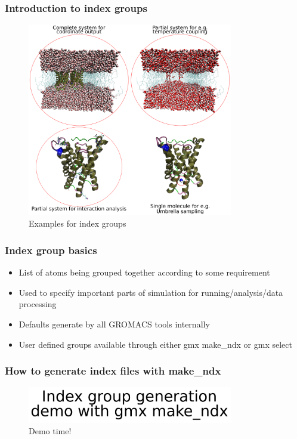 \documentclass{beamer}
\numberwithin{table}{section}
\numberwithin{figure}{section}
\numberwithin{equation}{section}
\begin{document}
\begin{frame}
\frametitle{Introduction to index groups}
    \begin{figure}[htb]
        \centering
        \includegraphics[keepaspectratio=true, width=0.8\textwidth]{figures/index-groups.pdf}
        \caption{Examples for index groups}
    \end{figure}
\end{frame}

\begin{frame}
\frametitle{Index group basics}
    \begin{itemize}
        \item{List of atoms being grouped together according to some requirement}
        \item{Used to specify important parts of simulation for running/analysis/data processing}
        \item{Defaults generate by all GROMACS tools internally}
        \item{User defined groups available through either gmx make\_ndx or gmx select}
    \end{itemize}
\end{frame}

\begin{frame}
\frametitle{How to generate index files with make\_ndx}
    \begin{figure}[htb]
        \centering
        \includegraphics[keepaspectratio=true, width=0.8\textwidth]{figures/demo.pdf}
        \caption{Demo time!}
    \end{figure}
\end{frame}
\end{document}
